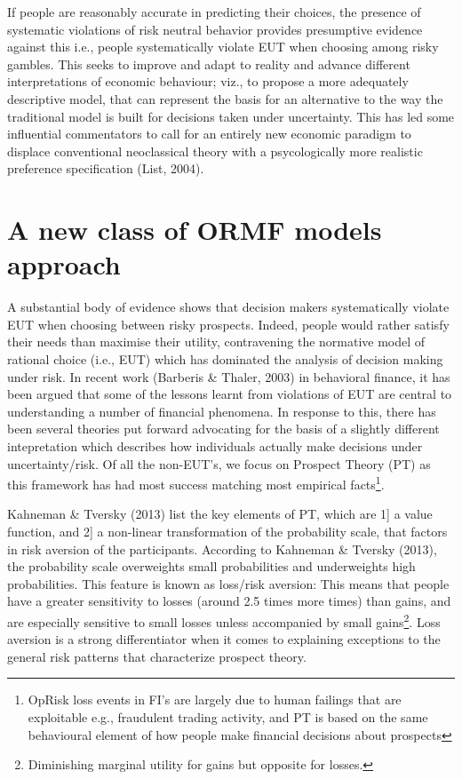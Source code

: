 \documentclass{DissertateUSU}
\begin{document}
If people are reasonably accurate in predicting their choices, the
presence of systematic violations of risk neutral behavior provides
presumptive evidence against this i.e., people systematically violate
EUT when choosing among risky gambles. This seeks to improve and adapt
to reality and advance different interpretations of economic behaviour;
viz., to propose a more adequately descriptive model, that can represent
the basis for an alternative to the way the traditional model is built
for decisions taken under uncertainty. This has led some influential
commentators to call for an entirely new economic paradigm to displace
conventional neoclassical theory with a psycologically more realistic
preference specification (List, 2004).

\section{A new class of ORMF models approach}
\label{sec:A new class of ORMF models approach}

A substantial body of evidence shows that decision makers systematically
violate EUT when choosing between risky prospects. Indeed, people would
rather satisfy their needs than maximise their utility, contravening the
normative model of rational choice (i.e., EUT) which has dominated the
analysis of decision making under risk. In recent work (Barberis \&
Thaler, 2003) in behavioral finance, it has been argued that some of the
lessons learnt from violations of EUT are central to understanding a
number of financial phenomena. In response to this, there has been
several theories put forward advocating for the basis of a slightly
different intepretation which describes how individuals actually make
decisions under uncertainty/risk. Of all the non-EUT's, we focus on
Prospect Theory (PT) as this framework has had most success matching
most empirical
facts\footnote{OpRisk loss events in FI's are largely due to human failings that are exploitable e.g., fraudulent trading activity, and PT is based on the same behavioural element of how people make financial decisions about prospects}.\medskip 

Kahneman \& Tversky (2013) list the key elements of PT, which are 1{]} a
value function, and 2{]} a non-linear transformation of the probability
scale, that factors in risk aversion of the participants. According to
Kahneman \& Tversky (2013), the probability scale overweights small
probabilities and underweights high probabilities. This feature is known
as loss/risk aversion: This means that people have a greater sensitivity
to losses (around 2.5 times more times) than gains, and are especially
sensitive to small losses unless accompanied by small
gains\footnote{Diminishing marginal utility for gains but opposite for losses.}.
Loss aversion is a strong differentiator when it comes to explaining
exceptions to the general risk patterns that characterize prospect
theory.\medskip 
\end{document}
